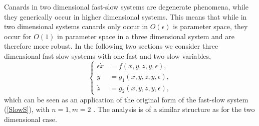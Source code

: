 

Canards in two dimensional fast-slow systems are degenerate phenomena, while they generically occur in higher dimensional systems.
This means that while in two dimensional systems canards only occur in $O(\epsilon)$ is parameter space, they occur for $O(1)$ in parameter space in a three dimensional system and are therefore more robust.
In the following two sections we consider three dimensional fast slow systems with one fast and two slow variables,
\begin{equation}
\begin{cases}
\epsilon \dot{x} &=f(x,y,z,y,\epsilon),\\
\dot{y}&=g_1(x,y,z,y,\epsilon),\\
\dot{z}&=g_2(x,y,z,y,\epsilon),
\end{cases}\label{eq: fs singularity system}
\end{equation}
which can be seen as an application of the original form of the fast-slow system (\ref{SlowS}), with $n=1,m=2$ \citep{MMO}.
The analysis is of a similar structure as for the two dimensional case.

